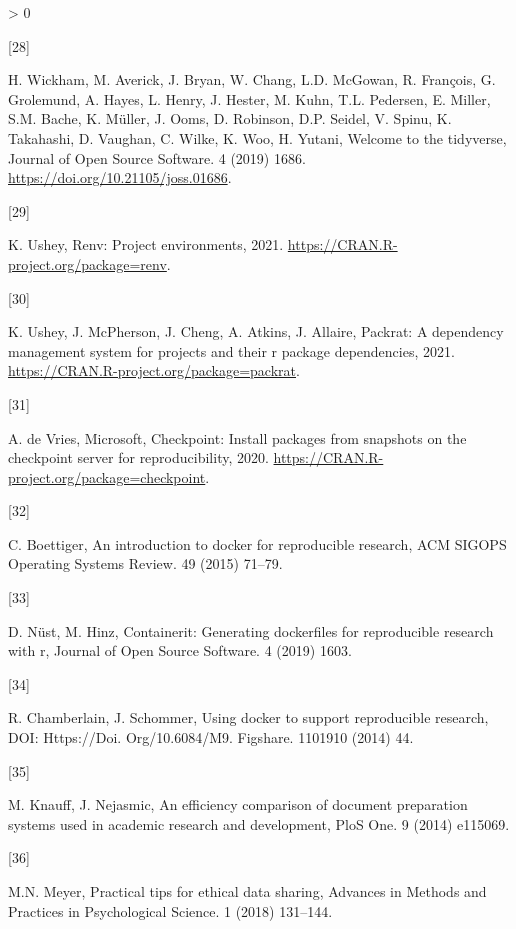\documentclass[]{elsarticle} %
\newlength{\csllabelwidth}
\newlength{\cslhangindent}
\newenvironment{CSLReferences}[3] %
 {%
  \setlength{\parindent}{0pt}
  \ifodd #1 \everypar{\setlength{\hangindent}{\cslhangindent}}\ignorespaces\fi
  \ifnum #2 > 0
  \setlength{\parskip}{#2\baselineskip}
  \fi
 }%
 {}
\newcommand{\CSLLeftMargin}[1]{\parbox[t]{\csllabelwidth}{#1}}
\newcommand{\CSLRightInline}[1]{\parbox[t]{\linewidth - \csllabelwidth}{#1}}
\begin{document}
\begin{CSLReferences}{0}{0}
\leavevmode\hypertarget{ref-wickham2019}{}%
\CSLLeftMargin{{[}28{]} }
\CSLRightInline{H. Wickham, M. Averick, J. Bryan, W. Chang, L.D.
McGowan, R. François, G. Grolemund, A. Hayes, L. Henry, J. Hester, M.
Kuhn, T.L. Pedersen, E. Miller, S.M. Bache, K. Müller, J. Ooms, D.
Robinson, D.P. Seidel, V. Spinu, K. Takahashi, D. Vaughan, C. Wilke, K.
Woo, H. Yutani, Welcome to the {tidyverse}, Journal of Open Source
Software. 4 (2019) 1686. \url{https://doi.org/10.21105/joss.01686}.}

\leavevmode\hypertarget{ref-renv}{}%
\CSLLeftMargin{{[}29{]} }
\CSLRightInline{K. Ushey, Renv: Project environments, 2021.
\url{https://CRAN.R-project.org/package=renv}.}

\leavevmode\hypertarget{ref-ushley2021packrat}{}%
\CSLLeftMargin{{[}30{]} }
\CSLRightInline{K. Ushey, J. McPherson, J. Cheng, A. Atkins, J. Allaire,
Packrat: A dependency management system for projects and their r package
dependencies, 2021. \url{https://CRAN.R-project.org/package=packrat}.}

\leavevmode\hypertarget{ref-devries2020checkpoint}{}%
\CSLLeftMargin{{[}31{]} }
\CSLRightInline{A. de Vries, Microsoft, Checkpoint: Install packages
from snapshots on the checkpoint server for reproducibility, 2020.
\url{https://CRAN.R-project.org/package=checkpoint}.}

\leavevmode\hypertarget{ref-boettiger2015introduction}{}%
\CSLLeftMargin{{[}32{]} }
\CSLRightInline{C. Boettiger, An introduction to docker for reproducible
research, ACM SIGOPS Operating Systems Review. 49 (2015) 71--79.}

\leavevmode\hypertarget{ref-nust2019containerit}{}%
\CSLLeftMargin{{[}33{]} }
\CSLRightInline{D. Nüst, M. Hinz, Containerit: Generating dockerfiles
for reproducible research with r, Journal of Open Source Software. 4
(2019) 1603.}

\leavevmode\hypertarget{ref-chamberlain2014using}{}%
\CSLLeftMargin{{[}34{]} }
\CSLRightInline{R. Chamberlain, J. Schommer, Using docker to support
reproducible research, DOI: Https://Doi. Org/10.6084/M9. Figshare.
1101910 (2014) 44.}

\leavevmode\hypertarget{ref-knauff2014efficiency}{}%
\CSLLeftMargin{{[}35{]} }
\CSLRightInline{M. Knauff, J. Nejasmic, An efficiency comparison of
document preparation systems used in academic research and development,
PloS One. 9 (2014) e115069.}

\leavevmode\hypertarget{ref-meyer2018practical}{}%
\CSLLeftMargin{{[}36{]} }
\CSLRightInline{M.N. Meyer, Practical tips for ethical data sharing,
Advances in Methods and Practices in Psychological Science. 1 (2018)
131--144.}


\end{CSLReferences}
\end{document}
